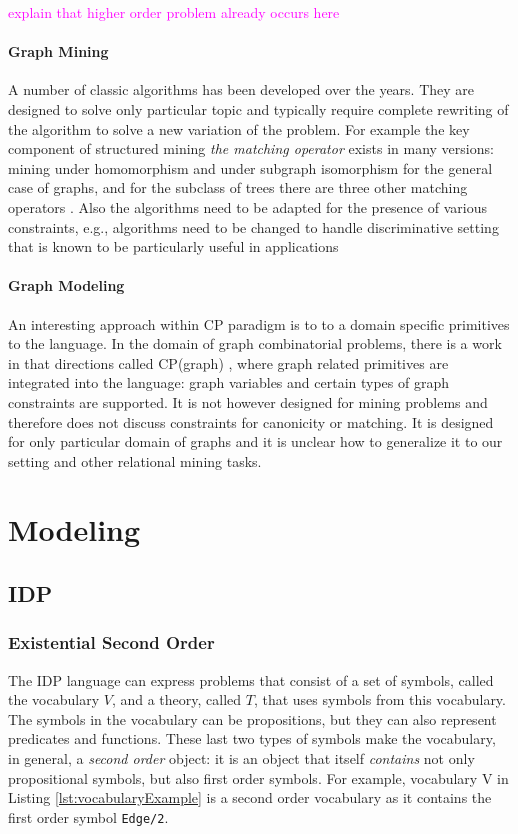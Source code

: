 \documentclass{article}
\theoremstyle{definition}
\newcommand{\sergey}[1]{\textcolor{magenta}{\marginpar{\sc Sergey} #1}}
\begin{document}
\sergey{explain that higher order problem already occurs here}

\paragraph{Graph Mining} A number of classic algorithms has been developed over the years. They are designed to solve only particular topic and typically require complete rewriting of the algorithm to solve a new variation of the problem. For example the key component of structured mining \textit{the matching operator} exists in many versions: mining under homomorphism \citep{theta_subsumption} and under subgraph isomorphism \citep{gspan} for the general case of graphs, and for the subclass of trees there are three other matching operators \citep{subtree_overview}. Also the algorithms need to be adapted for the presence of various constraints, e.g., algorithms need to be changed to handle discriminative setting that is known to be particularly useful in applications \citep{pattern_mining_classification}

\paragraph{Graph Modeling} An interesting approach within CP paradigm is to to a domain specific primitives to the language. In the domain of graph combinatorial problems, there is a work in that directions called CP(graph) \citep{cp_graph}, where graph related primitives are integrated into the language: graph variables and certain types of graph constraints are supported. It is not however designed for mining problems and therefore does not discuss constraints for canonicity or matching. It is designed for only particular domain of graphs and it is unclear how to generalize it to our setting and other relational mining tasks.


\section{Modeling}
\subsection{IDP}
\subsubsection{Existential Second Order}
The IDP language can express problems that consist of a set of symbols, called the vocabulary $V$, and a theory, called $T$, that uses symbols from this vocabulary.
The symbols in the vocabulary can be propositions, but they can also represent predicates and functions.
These last two types of symbols make the vocabulary, in general, a \emph{second order} object: it is an object that itself \emph{contains} not only propositional symbols, but also first order symbols.
For example, vocabulary V in Listing \ref{lst:vocabularyExample} is a second order vocabulary as it contains the first order symbol \lstinline{Edge/2}.
\end{document}
